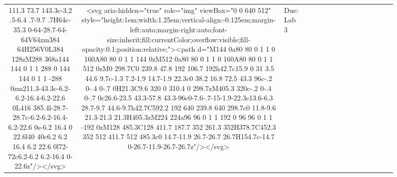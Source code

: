 \documentclass[
]{article}
\begin{document}
\begin{figure*}
\begin{longtable*}{cclllccccccccccl}
111.3 73.7 143.3c-3.2 .5-6.4 .7-9.7 .7H64c-35.3 0-64-28.7-64-64V64zm384 64H256V0L384 128zM288 368a144 144 0 1 1 288 0 144 144 0 1 1 -288 0zm211.3-43.3c-6.2-6.2-16.4-6.2-22.6 0L416 385.4l-28.7-28.7c-6.2-6.2-16.4-6.2-22.6 0s-6.2 16.4 0 22.6l40 40c6.2 6.2 16.4 6.2 22.6 0l72-72c6.2-6.2 6.2-16.4 0-22.6z"/></svg> & <svg aria-hidden="true" role="img" viewBox="0 0 640 512" style="height:1em;width:1.25em;vertical-align:-0.125em;margin-left:auto;margin-right:auto;font-size:inherit;fill:currentColor;overflow:visible;fill-opacity:0.1;position:relative;"><path d="M144 0a80 80 0 1 1 0 160A80 80 0 1 1 144 0zM512 0a80 80 0 1 1 0 160A80 80 0 1 1 512 0zM0 298.7C0 239.8 47.8 192 106.7 192h42.7c15.9 0 31 3.5 44.6 9.7c-1.3 7.2-1.9 14.7-1.9 22.3c0 38.2 16.8 72.5 43.3 96c-.2 0-.4 0-.7 0H21.3C9.6 320 0 310.4 0 298.7zM405.3 320c-.2 0-.4 0-.7 0c26.6-23.5 43.3-57.8 43.3-96c0-7.6-.7-15-1.9-22.3c13.6-6.3 28.7-9.7 44.6-9.7h42.7C592.2 192 640 239.8 640 298.7c0 11.8-9.6 21.3-21.3 21.3H405.3zM224 224a96 96 0 1 1 192 0 96 96 0 1 1 -192 0zM128 485.3C128 411.7 187.7 352 261.3 352H378.7C452.3 352 512 411.7 512 485.3c0 14.7-11.9 26.7-26.7 26.7H154.7c-14.7 0-26.7-11.9-26.7-26.7z"/></svg> & Due: Lab 3 \\ 

\end{longtable*}
\end{figure*}
\end{document}
